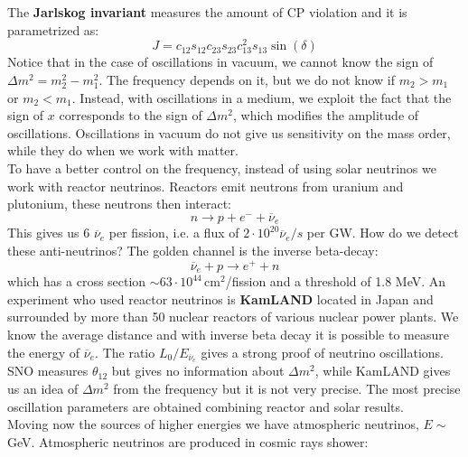 \documentclass[10.75pt,a4paper,openright,bottom=2cm]{article}
\begin{document}
The \textbf{Jarlskog invariant} measures the amount of CP violation and it is parametrized as:
\[
J=c_{12}s_{12}c_{23}s_{23}c_{13}^2s_{13}\sin(\delta)
\]
Notice that in the case of oscillations in vacuum, we cannot know the sign of $\Delta m^2=m_2^2-m_1^2$. The frequency depends on it, but we do not know if $m_2>m_1$ or $m_2<m_1$. Instead, with oscillations in a medium, we exploit the fact that the sign of $x$ corresponds to the sign of $\Delta m^2$, which modifies the amplitude of oscillations. Oscillations in vacuum do not give us sensitivity on the mass order, while they do when we work with matter.\\
To have a better control on the frequency, instead of using solar neutrinos we work with reactor neutrinos. Reactors emit neutrons from uranium and plutonium, these neutrons then interact:
\[
n\to p+e^-+\overline{\nu}_e
\]
This gives us 6 $\overline{\nu}_e$ per fission, i.e. a flux of $2\cdot10^{20}\overline{\nu}_e/s$ per GW. How do we detect these anti-neutrinos? The golden channel is the inverse beta-decay:
\[
\overline{\nu}_e+p\to e^++n
\]
which has a cross section $\sim63\cdot10^{44}$\,cm$^2$/fission and a threshold of 1.8 MeV. An experiment who used reactor neutrinos is \textbf{KamLAND} located in Japan and surrounded by more than 50 nuclear reactors of various nuclear power plants. We know the average distance and with inverse beta decay it is possible to measure the energy of $\overline{\nu}_e$. The ratio $L_0/E_{\overline{\nu}_e}$ gives a strong proof of neutrino oscillations. SNO measures $\theta_{12}$ but gives no information about $\Delta m^2$, while KamLAND gives us an idea of $\Delta m^2$ from the frequency but it is not very precise. The most precise oscillation parameters are obtained combining reactor and solar results.\\
Moving now the sources of higher energies we have atmospheric neutrinos, $E\sim$\,GeV. Atmospheric neutrinos are produced in cosmic rays shower:\\
\end{document}
